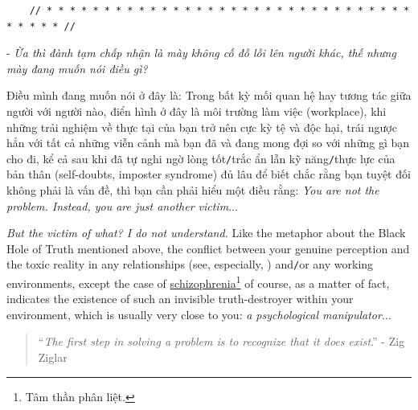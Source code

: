 \documentclass[12pt]{article}
\numberwithin{equation}{section}
\begin{document}
\begin{verbatim}
    // * * * * * * * * * * * * * * * * * * * * * * * * * * * * * * * * * * * * * //
\end{verbatim}

\noindent
{} - \textit{Ừa thì đành tạm chấp nhận là mày không cố đỗ lỗi lên người khác, thế nhưng mày đang muốn nói điều gì?}

Điều mình đang muốn nói ở đây là: Trong bất kỳ mối quan hệ hay tương tác giữa người với người nào, điển hình ở đây là môi trường làm việc (workplace), khi những trải nghiệm về thực tại của bạn trở nên cực kỳ tệ và độc hại, trái ngược hẳn với tất cả những viễn cảnh mà bạn đã và đang mong đợi so với những gì bạn cho đi, kể cả sau khi đã tự nghi ngờ lòng tốt\texttt{/}trắc ẩn lẫn kỹ năng\texttt{/}thực lực của bản thân (self-doubts, imposter syndrome) đủ lâu để biết chắc rằng bạn tuyệt đối không phải là vấn đề, thì bạn cần phải hiểu một điều rằng: \textit{You are not the problem. Instead, you are just another victim}$\ldots$

\textit{But the victim of what? I do not understand.} Like the metaphor about the Black Hole of Truth mentioned above, the conflict between your genuine perception and the toxic reality in any relationships (see, especially, \cite{Bancroft2003}) and\texttt{/}or any working environments, except the case of \href{https://en.wikipedia.org/wiki/Schizophrenia}{schizophrenia}\footnote{Tâm thần phân liệt.} of course, as a matter of fact, indicates the existence of such an invisible truth-destroyer within your environment, which is usually very close to you: \textit{a psychological manipulator}$\ldots$

\begin{quotation}
    ``\textit{The first step in solving a problem is to recognize that it does exist}.'' - Zig Ziglar
\end{quotation}
\end{document}
